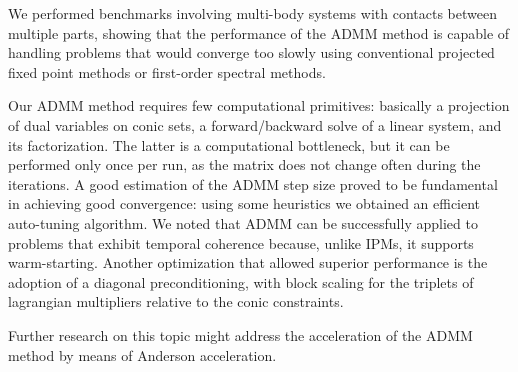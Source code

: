 \documentclass[AMA,STIX1COL]{WileyNJD-v2}
\begin{document}
We performed benchmarks involving multi-body systems with contacts between multiple parts, showing that the performance of the ADMM method is capable of handling problems that would converge too slowly using conventional projected fixed point methods or first-order spectral methods.

Our ADMM method requires few computational primitives: basically a projection of dual variables on conic sets, a forward/backward solve of a linear system, and its factorization. The latter is a computational bottleneck, but it can be performed only once per run, as the matrix does not change often during the iterations. 
A good estimation of the ADMM step size proved to be fundamental in achieving good convergence: using some heuristics we obtained an efficient auto-tuning algorithm. 
We noted that ADMM can be successfully applied to problems that exhibit temporal coherence because, unlike IPMs, it supports warm-starting. 
Another optimization that allowed superior performance is the adoption of a diagonal preconditioning, with block scaling for the triplets of lagrangian multipliers relative to the conic constraints.

Further research on this topic might address the acceleration of the ADMM method by means of Anderson acceleration.




\end{document}
